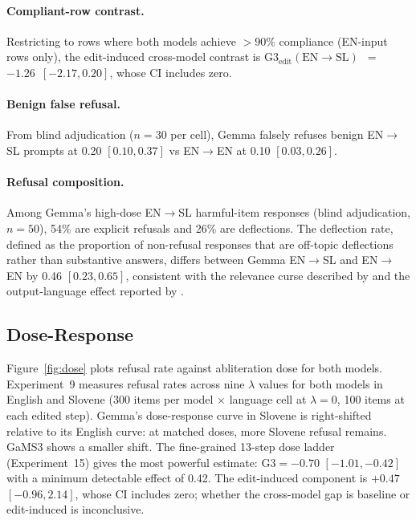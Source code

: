 \documentclass[11pt,letterpaper]{article}
\begin{document}
\paragraph{Compliant-row contrast.}
Restricting to rows where both models achieve ${>}90\%$ compliance (EN-input rows only), the edit-induced cross-model contrast is $\mathrm{G3}_{\text{edit}}(\text{EN}{\to}\text{SL})$~$=$~$-1.26$~$[-2.17,\allowbreak 0.20]$, whose CI includes zero.

\paragraph{Benign false refusal.}
From blind adjudication ($n = 30$ per cell), Gemma falsely refuses benign EN$\to$SL prompts at 0.20 $[0.10, 0.37]$ vs EN$\to$EN at 0.10 $[0.03, 0.26]$.

\paragraph{Refusal composition.}
Among Gemma's high-dose EN$\to$SL harmful-item responses (blind adjudication, $n = 50$), 54\% are explicit refusals and 26\% are deflections.
The deflection rate, defined as the proportion of non-refusal responses that are off-topic deflections rather than substantive answers, differs between Gemma EN$\to$SL and EN$\to$EN by 0.46 $[0.23, 0.65]$, consistent with the relevance curse described by \citet{Shen2024} and the output-language effect reported by \citet{Addagada2026}.

\subsection{Dose-Response}

Figure~\ref{fig:dose} plots refusal rate against abliteration dose for both models.
Experiment~9 measures refusal rates across nine $\lambda$ values for both models in English and Slovene (300 items per model $\times$ language cell at $\lambda = 0$, 100 items at each edited step).
Gemma's dose-response curve in Slovene is right-shifted relative to its English curve: at matched doses, more Slovene refusal remains.
GaMS3 shows a smaller shift.
The fine-grained 13-step dose ladder (Experiment~15) gives the most powerful estimate: $\mathrm{G3} = -0.70$ $[-1.01, -0.42]$ with a minimum detectable effect of 0.42.
The edit-induced component is $+0.47$ $[-0.96, 2.14]$, whose CI includes zero; whether the cross-model gap is baseline or edit-induced is inconclusive.
\end{document}
